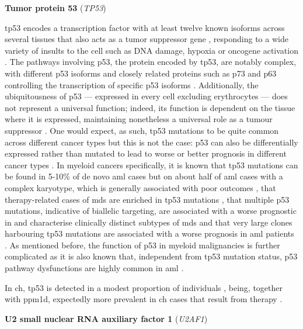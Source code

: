 \noindent \textbf{Tumor protein 53} (\textit{TP53})

\Ac{tp53} encodes a transcription factor with at least twelve known isoforms across several tissues \cite{Khoury2011-yk,Bourdon2005-ne} that also acts as a tumor suppressor gene \cite{Surget2013-xh}, responding to a wide variety of insults to the cell such as DNA damage, hypoxia or oncogene activation \cite{Oren2003-gg}. The pathways involving p53, the protein encoded by \ac{tp53}, are notably complex, with different p53 isoforms and closely related proteins such as p73 and p63 controlling the transcription of specific p53 isoforms \cite{Bourdon2005-ne}. Additionally, the ubiquitousness of p53 --- expressed in every cell excluding erythrocytes --- does not represent a universal function; indeed, its function is dependent on the tissue where it is expressed, maintaining nonetheless a universal role as a tumour suppressor \cite{Surget2013-xh}. One would expect, as such, \ac{tp53} mutations to be quite common across different cancer types but this is not the case: p53 can also be differentially expressed rather than mutated to lead to worse or better prognosis in different cancer types \cite{Bourdon2011-hc,Song2009-oq,Surget2013-xh}. In myeloid cancers specifically, it is known that \ac{tp53} mutations can be found in 5-10\% of de novo \ac{aml} cases but on about half of \ac{aml} cases with a complex karyotype, which is generally associated with poor outcomes \cite{Hou2015-jz,Rucker2012-oj,Bowen2009-ep}, that therapy-related cases of \ac{mds} are enriched in \ac{tp53} mutations \cite{Wong2015-ki}, that multiple p53 mutations, indicative of biallelic targeting, are associated with a worse prognostic in and characterise clinically distinct subtypes of \ac{mds} \cite{Bernard2020-fj} and that very large clones harbouring \ac{tp53} mutations are associated with a worse prognosis in \ac{aml} patients \cite{Short2020-qu}. As mentioned before, the function of p53 in myeloid malignancies is further complicated as it is also known that, independent from \ac{tp53} mutation status, p53 pathway dysfunctions are highly common in \ac{aml} \cite{Quintas-Cardama2017-tj,Abramowitz2017-lg}.

In \ac{ch}, \ac{tp53} is detected in a modest proportion of individuals \cite{Jaiswal2014-rl,Bolton2020-ct,Genovese2014-eu,Xie2014-np,Zink2017-zi}, being, together with \ac{ppm1d}, expectedly more prevalent in \ac{ch} cases that result from therapy \cite{Zehir2017-gh}.

\noindent \textbf{U2 small nuclear RNA auxiliary factor 1} (\textit{U2AF1})

